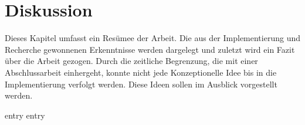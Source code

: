 \chapter{Diskussion}
\label{chap:diskussion}

Dieses Kapitel umfasst ein Resümee der Arbeit.  Die aus der Implementierung und
Recherche gewonnenen Erkenntnisse werden dargelegt und zuletzt wird ein Fazit
über die Arbeit gezogen.  Durch die zeitliche Begrenzung, die mit einer
Abschlussarbeit einhergeht, konnte nicht jede Konzeptionelle Idee bis in die
Implementierung verfolgt werden.  Diese Ideen sollen im Ausblick vorgestellt
werden.

{entry}
{entry}
